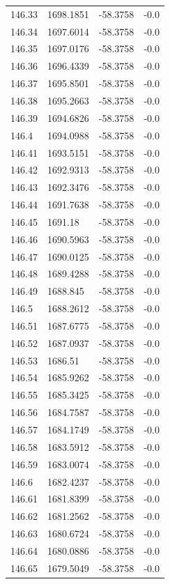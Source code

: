 \begin{table}[H]
\begin{tabular}{llll}
146.33 & 1698.1851 & -58.3758 & -0.0 \\
146.34 & 1697.6014 & -58.3758 & -0.0 \\
146.35 & 1697.0176 & -58.3758 & -0.0 \\
146.36 & 1696.4339 & -58.3758 & -0.0 \\
146.37 & 1695.8501 & -58.3758 & -0.0 \\
146.38 & 1695.2663 & -58.3758 & -0.0 \\
146.39 & 1694.6826 & -58.3758 & -0.0 \\
146.4 & 1694.0988 & -58.3758 & -0.0 \\
146.41 & 1693.5151 & -58.3758 & -0.0 \\
146.42 & 1692.9313 & -58.3758 & -0.0 \\
146.43 & 1692.3476 & -58.3758 & -0.0 \\
146.44 & 1691.7638 & -58.3758 & -0.0 \\
146.45 & 1691.18 & -58.3758 & -0.0 \\
146.46 & 1690.5963 & -58.3758 & -0.0 \\
146.47 & 1690.0125 & -58.3758 & -0.0 \\
146.48 & 1689.4288 & -58.3758 & -0.0 \\
146.49 & 1688.845 & -58.3758 & -0.0 \\
146.5 & 1688.2612 & -58.3758 & -0.0 \\
146.51 & 1687.6775 & -58.3758 & -0.0 \\
146.52 & 1687.0937 & -58.3758 & -0.0 \\
146.53 & 1686.51 & -58.3758 & -0.0 \\
146.54 & 1685.9262 & -58.3758 & -0.0 \\
146.55 & 1685.3425 & -58.3758 & -0.0 \\
146.56 & 1684.7587 & -58.3758 & -0.0 \\
146.57 & 1684.1749 & -58.3758 & -0.0 \\
146.58 & 1683.5912 & -58.3758 & -0.0 \\
146.59 & 1683.0074 & -58.3758 & -0.0 \\
146.6 & 1682.4237 & -58.3758 & -0.0 \\
146.61 & 1681.8399 & -58.3758 & -0.0 \\
146.62 & 1681.2562 & -58.3758 & -0.0 \\
146.63 & 1680.6724 & -58.3758 & -0.0 \\
146.64 & 1680.0886 & -58.3758 & -0.0 \\
146.65 & 1679.5049 & -58.3758 & -0.0 \\

\end{tabular}
\end{table}
